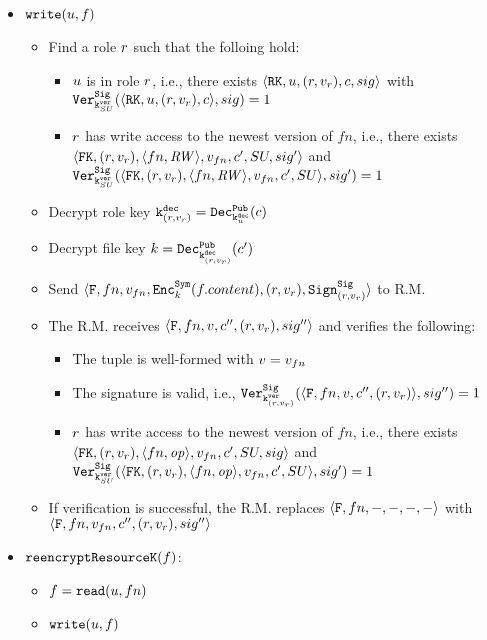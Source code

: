 {\begin{itemize}
        \item \( \writeF \)
        \begin{itemize}
            \item Find a role \( \role \) such that the folloing hold:
            \begin{itemize}
                \item \( \user \) is in role \( \role \), i.e., there exists \( \rt{\user}{(\role, \rolev)}{c}{sig} \) with \( \verifysig{\keyver{SU}}{\rts{\user}{(\role, \rolev)}{c}, sig} \)
                \item \( \role \) has write access to the newest version of \( fn \), i.e., there exists \( \pt{(\role, \rolev)}{\twoang{fn}{\opreadwrite}}{\filev}{c'}{SU}{sig'} \) and \( \verifysig{\keyver{SU}}{\pts{(\role, \rolev)}{\twoang{fn}{\opreadwrite}}{\filev}{c'}{SU}, sig'} \)
            \end{itemize}
            \item Decrypt role key \( \keydecr{\rolev} = \decpub{\keydecu}{c} \)
            \item Decrypt file key \( k = \decpub{\keydecr{\rolev}}{c'} \)
            \item Send \( \ft{fn}{\filev}{\encsym{k}{\file.content}}{(\role, \rolev)}{\sig{(\role, \rolev)}} \) to R.M.
            \item The R.M. receives \( \ft{fn}{v}{c''}{(\role, \rolev)}{sig''} \) and verifies the following:
            \begin{itemize}
                \item The tuple is well-formed with \( \version = \filev \)
                \item The signature is valid, i.e., \( \verifysig{\keyverr{\rolev}}{\fts{fn}{v}{c''}{(\role, \rolev)}, sig''} \)
                \item \( \role \) has write access to the newest version of \( fn \), i.e., there exists \( \pt{(\role, \rolev)}{\twoang{fn}{\operation}}{\filev}{c'}{SU}{sig} \) and \( \verifysig{\keyver{SU}}{\pts{(\role, \rolev)}{\twoang{fn}{\operation}}{\filev}{c'}{SU}, sig'} \)
            \end{itemize}
            \item If verification is successful, the R.M. replaces \( \ft{fn}{-}{-}{-}{-} \) with \( \ft{fn}{\filev}{c''}{(\role, \rolev)}{sig''} \)
        \end{itemize}


        \item \( \reencryptResourceF \):
        \begin{itemize}
            \item \( \file = \readF \)
            \item \( \writeF \)
        \end{itemize}
    \end{itemize}
}